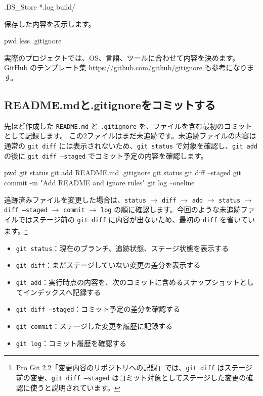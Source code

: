 \documentclass[a4paper,11pt]{jlreq}
\newcommand{\cmd}[1]{\texttt{#1}}
\begin{document}
\begin{codeblock}
.DS_Store
*.log
build/
\end{codeblock}

保存した内容を表示します。

\begin{codeblock}
pwd
less .gitignore
\end{codeblock}

実際のプロジェクトでは、OS、言語、ツールに合わせて内容を決めます。GitHub のテンプレート集 \url{https://github.com/github/gitignore} も参考になります。

\subsection{README.mdと.gitignoreをコミットする}
\enlargethispage{2pt}

先ほど作成した \cmd{README.md} と \cmd{.gitignore} を、ファイルを含む最初のコミットとして記録します。
この2ファイルはまだ未追跡です。未追跡ファイルの内容は通常の \cmd{git diff} には表示されないため、\cmd{git status} で対象を確認し、\cmd{git add} の後に \cmd{git diff --staged} でコミット予定の内容を確認します。

\begin{codeblock}
pwd
git status
git add README.md .gitignore
git status
git diff --staged
git commit -m "Add README and ignore rules"
git log --oneline
\end{codeblock}

追跡済みファイルを変更した場合は、\cmd{status} $\rightarrow$ \cmd{diff} $\rightarrow$ \cmd{add} $\rightarrow$ \cmd{status} $\rightarrow$ \cmd{diff --staged} $\rightarrow$ \cmd{commit} $\rightarrow$ \cmd{log} の順に確認します。今回のような未追跡ファイルではステージ前の \cmd{git diff} に内容が出ないため、最初の \cmd{diff} を省いています。\footnote{\href{https://git-scm.com/book/ja/v2/Git-の基本-変更内容のリポジトリへの記録}{Pro Git 2.2「変更内容のリポジトリへの記録」}では、\cmd{git diff} はステージ前の変更、\cmd{git diff --staged} はコミット対象としてステージした変更の確認に使うと説明されています。}

\begin{itemize}
  \item \cmd{git status}：現在のブランチ、追跡状態、ステージ状態を表示する
  \item \cmd{git diff}：まだステージしていない変更の差分を表示する
  \item \cmd{git add}：実行時点の内容を、次のコミットに含めるスナップショットとしてインデックスへ記録する
  \item \cmd{git diff --staged}：コミット予定の差分を確認する
  \item \cmd{git commit}：ステージした変更を履歴に記録する
  \item \cmd{git log}：コミット履歴を確認する
\end{itemize}
\end{document}
